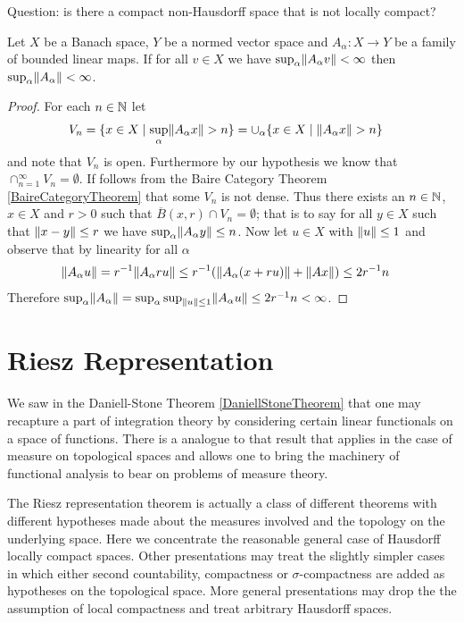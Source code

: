 Question: is there a compact non-Hausdorff space that is not locally compact?

\begin{thm}\label{PrincipleOfUniformBoundedness}Let $X$ be a Banach space, $Y$ be a normed vector space and
  $A_\alpha : X \to Y$ be a family of bounded linear maps.  If for all
  $v \in X$ we have $\sup_\alpha \lVert A_\alpha v \rVert <\infty$ then
  $\sup_\alpha \lVert A_\alpha \rVert < \infty$.
\end{thm}
\begin{proof}
For each $n \in \mathbb{N}$ let 
\begin{align*}
V_n &= \lbrace x \in X \mid \sup_\alpha
\lVert A_\alpha x \rVert > n \rbrace
= \cup_\alpha \lbrace x \in X \mid \lVert A_\alpha x \rVert > n \rbrace
\end{align*}
 and note that $V_n$ is open.
Furthermore by our hypothesis we know that $\cap_{n=1}^\infty V_n =
\emptyset$.  If follows from the Baire Category Theorem
\ref{BaireCategoryTheorem} that some $V_n$ is not dense.  Thus there
exists an $n \in \mathbb{N}$, $x \in X$ and $r > 0$ such that
$\overline{B}(x,r) \cap V_n = \emptyset$; that is to say for all $y
\in X$ such that $\lVert x-y \rVert \leq r$ we have $\sup_\alpha
\lVert A_\alpha y \rVert \leq n$.  
Now let $u \in X$ with
$\lVert u \rVert \leq 1$ and observe that by linearity for all $\alpha$ 
\begin{align*} 
\lVert A_\alpha u \rVert &=
r^{-1} \lVert A_\alpha ru \rVert  \leq r^{-1}( \lVert A_\alpha (x + ru)  \rVert +
                    \lVert A x \rVert) \leq 2 r^{-1} n
\end{align*}
Therefore $\sup_\alpha \lVert A_\alpha \rVert = \sup_\alpha \sup_{\lVert u \rVert
  \leq 1} \lVert A_\alpha u \rVert  \leq 2 r^{-1} n < \infty$.
\end{proof}

\section{Riesz Representation}

We saw in the Daniell-Stone Theorem \ref{DaniellStoneTheorem} that one
may recapture a part of integration theory by considering certain
linear functionals on a space of functions.  There is a analogue to
that result that applies in the case of measure on topological
spaces and allows one to bring the machinery of functional analysis to
bear on problems of measure theory.  

The Riesz representation theorem is actually a class of different
theorems with different hypotheses made about the measures involved
and the topology on the
underlying space.  Here we concentrate the reasonable general case of
Hausdorff locally compact spaces.  Other presentations may treat the
slightly simpler cases in which either second countability,
compactness or
$\sigma$-compactness are added as hypotheses on the topological space.  More general
presentations may drop the the assumption of local compactness and treat
arbitrary Hausdorff spaces.  

